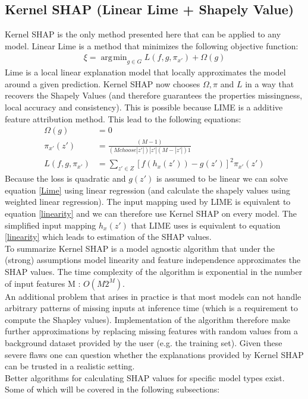 \documentclass[conference]{IEEEtran}
\DeclareMathOperator*{\argmin}{\arg\!\min}
\begin{document}
\subsection{Kernel SHAP (Linear Lime + Shapely Value)}
Kernel SHAP \cite{b2} is the only method presented here that can be applied to any model.
Linear Lime is a method that minimizes the following objective function:
\begin{align}
\xi = \argmin_{g \in G} L(f,g,\pi_{x'}) + \Omega(g) \label{Lime}
\end{align}
Lime is a local linear explanation model that locally approximates the model around a given prediction.
Kernel SHAP now chooses $\Omega, \pi$ and $L$ in a way that recovers the Shapely Values (and therefore guarantees the properties missingness, local accuracy and consistency). This is possible because LIME is a additive feature attribution method. This lead to the following equations:
\begin{align}
\Omega(g) &= 0\\
\pi_{x'}(z') &= \frac{(M - 1)}{(M choose |z'|)|z'|(M - |z'|)1}\\
L(f,g,\pi_{x'}) &= \sum_{z' \in Z}[f(h_x(z')) - g(z')]^2 \pi_{x'}(z')
\end{align}
Because the loss is quadratic and $g(z')$ is assumed to be linear we can solve equation \ref{Lime} using linear regression (and calculate the shapely values using weighted linear regression). 
The input mapping used by LIME is equivalent to equation \ref{linearity} and we can therefore use Kernel SHAP on every model.
The simplified input mapping $h_x(z')$ that LIME uses is equivalent to equation \ref{linearity} which leads to estimation of the SHAP values.\\
To summarize Kernel SHAP is a model agnostic algorithm that under the (strong) assumptions model linearity and feature independence approximates the SHAP values. The time complexity of the algorithm is exponential in the number of input features M : $O(M2^M)$\cite{b2}.\\
An additional problem that arises in practice is that most models can not handle arbitrary patterns of missing inputs at inference time (which is a requirement to compute the Shapley values).
Implementation of the algorithm therefore make further approximations by replacing missing features with random values from a background dataset provided by the user (e.g. the training set). 
Given these severe flaws one can question whether the explanations provided by Kernel SHAP can be trusted in a realistic setting.\\
Better algorithms for calculating SHAP values for specific model types exist. Some of which will be covered in the following subsections:\\
\end{document}
